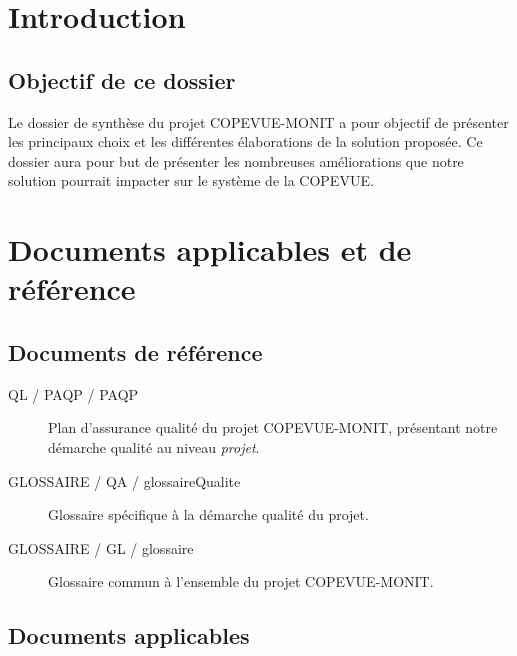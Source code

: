 \documentclass{mise_en_page}
\begin{document}
\maketitle

\begin{historique}
\end{historique}

\newpage

\tableofcontents

\section{Introduction}

\subsection{Objectif de ce dossier}
Le dossier de synthèse du projet COPEVUE-MONIT a pour objectif de présenter les principaux choix et les différentes élaborations de la solution proposée. Ce dossier aura pour but de présenter les nombreuses améliorations que notre solution pourrait impacter sur le système de la COPEVUE.

\section{Documents applicables et de référence}

\subsection{Documents de référence}

\begin{description}
	\item[QL / PAQP / PAQP] Plan d'assurance qualité du projet COPEVUE-MONIT, présentant notre démarche qualité au niveau \emph{projet}.
	\item[GLOSSAIRE / QA / glossaireQualite ] Glossaire spécifique à la démarche qualité du projet.
	\item[GLOSSAIRE / GL / glossaire ] Glossaire commun à l'ensemble du projet COPEVUE-MONIT.
\end{description}

\subsection{Documents applicables}
\end{document}

